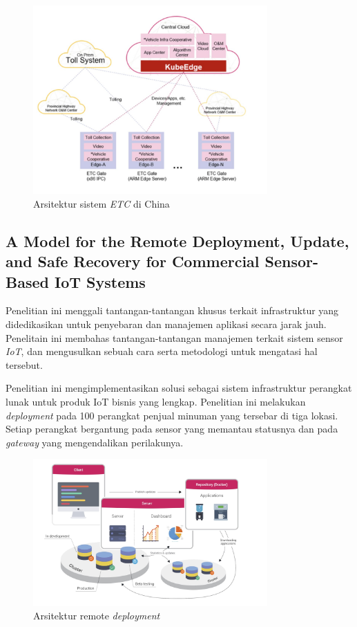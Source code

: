 \begin{figure}[h]
  \includegraphics[width=0.8\textwidth]{resources/chapter-2/arsitektur-china-highways.jpg}
  \caption{Arsitektur sistem \textit{ETC} di China \parencite{penelitianterkait1}}
  \label{fig:architecture-china-highways}
\end{figure}

\subsection{A Model for the Remote Deployment, Update, and Safe Recovery for Commercial Sensor-Based IoT Systems}
Penelitian ini menggali tantangan-tantangan khusus terkait infrastruktur yang didedikasikan untuk penyebaran dan manajemen aplikasi secara jarak jauh. Penelitain ini membahas tantangan-tantangan manajemen terkait sistem sensor \textit{IoT}, dan mengusulkan sebuah cara serta metodologi untuk mengatasi hal tersebut.

Penelitian ini mengimplementasikan solusi sebagai sistem infrastruktur perangkat lunak untuk produk IoT bisnis yang lengkap. Penelitian ini melakukan \textit{deployment} pada 100 perangkat penjual minuman yang tersebar di tiga lokasi. Setiap perangkat bergantung pada sensor yang memantau statusnya dan pada \textit{gateway} yang mengendalikan perilakunya.

\begin{figure}[h]
  \centering
  \includegraphics[width=0.8\textwidth]{resources/chapter-2/arsitektur-remote-deployment.jpg}
  \caption{Arsitektur remote \textit{deployment} \parencite{RemoteDeployment}}
  \label{fig:architecture-remote-deployments}
\end{figure}

